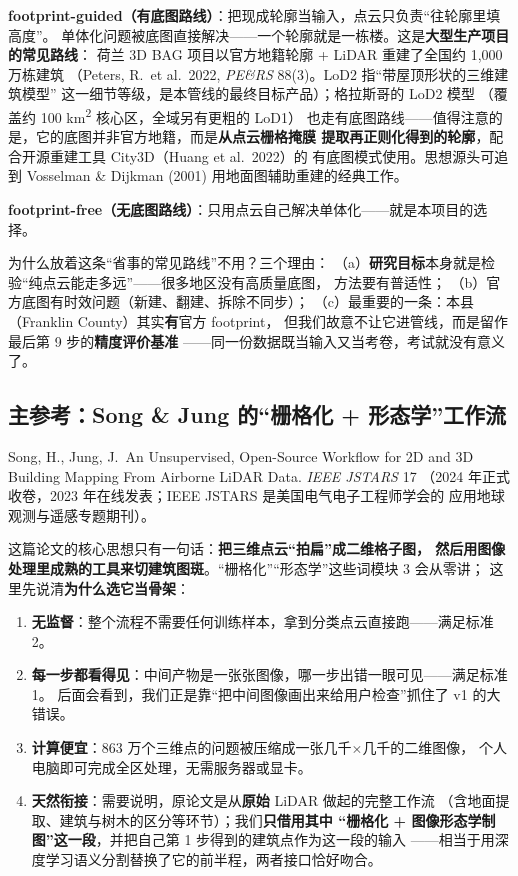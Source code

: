 \begin{paperbox}[：两条路线]
\textbf{footprint-guided（有底图路线）}：把现成轮廓当输入，点云只负责``往轮廓里填高度''。
单体化问题被底图直接解决——一个轮廓就是一栋楼。这是\textbf{大型生产项目的常见路线}：
荷兰 3D BAG 项目以官方地籍轮廓 + LiDAR 重建了全国约 1{,}000 万栋建筑
（Peters, R.\ et al.\ 2022, \textit{PE\&RS} 88(3)。LoD2 指``带屋顶形状的三维建筑模型''
这一细节等级，是本管线的最终目标产品）；格拉斯哥的 LoD2 模型
（覆盖约 100 km\textsuperscript{2} 核心区，全域另有更粗的 LoD1）
也走有底图路线——值得注意的是，它的底图并非官方地籍，而是\textbf{从点云栅格掩膜
提取再正则化得到的轮廓}，配合开源重建工具 City3D（Huang et al.\ 2022）的
有底图模式使用。思想源头可追到 Vosselman \& Dijkman (2001) 用地面图辅助重建的经典工作。

\textbf{footprint-free（无底图路线）}：只用点云自己解决单体化——就是本项目的选择。
\end{paperbox}

为什么放着这条``省事的常见路线''不用？三个理由：
（a）\textbf{研究目标}本身就是检验``纯点云能走多远''——很多地区没有高质量底图，
方法要有普适性；
（b）官方底图有时效问题（新建、翻建、拆除不同步）；
（c）最重要的一条：本县（Franklin County）其实\textbf{有}官方 footprint，
但我们故意不让它进管线，而是留作最后第 9 步的\textbf{精度评价基准}
——同一份数据既当输入又当考卷，考试就没有意义了。

\subsection{主参考：Song \& Jung 的``栅格化 + 形态学''工作流}

\begin{paperbox}[：主参考文献]
Song, H., Jung, J.\ An Unsupervised, Open-Source Workflow for 2D and 3D
Building Mapping From Airborne LiDAR Data. \textit{IEEE JSTARS} 17
（2024 年正式收卷，2023 年在线发表；IEEE JSTARS 是美国电气电子工程师学会的
应用地球观测与遥感专题期刊）。
\end{paperbox}

这篇论文的核心思想只有一句话：\textbf{把三维点云``拍扁''成二维格子图，
然后用图像处理里成熟的工具来切建筑图斑}。``栅格化''``形态学''这些词模块 3 会从零讲；
这里先说清\textbf{为什么选它当骨架}：

\begin{enumerate}
\item \textbf{无监督}：整个流程不需要任何训练样本，拿到分类点云直接跑——满足标准 2。
\item \textbf{每一步都看得见}：中间产物是一张张图像，哪一步出错一眼可见——满足标准 1。
      后面会看到，我们正是靠``把中间图像画出来给用户检查''抓住了 v1 的大错误。
\item \textbf{计算便宜}：863 万个三维点的问题被压缩成一张几千$\times$几千的二维图像，
      个人电脑即可完成全区处理，无需服务器或显卡。
\item \textbf{天然衔接}：需要说明，原论文是从\textbf{原始} LiDAR 做起的完整工作流
      （含地面提取、建筑与树木的区分等环节）；我们\textbf{只借用其中
      ``栅格化 + 图像形态学制图''这一段}，并把自己第 1 步得到的建筑点作为这一段的输入
      ——相当于用深度学习语义分割替换了它的前半程，两者接口恰好吻合。
\end{enumerate}

